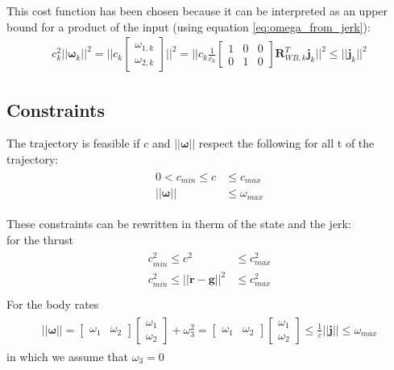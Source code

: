 This cost function has been chosen because it can be interpreted as an upper bound for a product of the input (using equation \ref{eq:omega_from_jerk}):
\begin{align}
c_k^2||\boldsymbol{\omega}_k||^2 = \Big|\Big| c_k
\begin{bmatrix}
\omega_{1,k} \\[2pt]
\omega_{2,k}
\end{bmatrix}\Big|\Big|^2 = \Big|\Big| c_k \frac{1}{c_k}
{\begin{bmatrix}
1 & 0 & 0  \\[2pt]
0 & 1 & 0
\end{bmatrix}}\boldsymbol{R}_{WB,k}^T \boldsymbol{j}_k\Big|\Big|^2 \leq ||\boldsymbol{j}_k||^2
\end{align}

\subsection{Constraints}
The trajectory is feasible if $c$ and $||\boldsymbol{\omega}||$ respect the following for all t of the trajectory:
\begin{align}
\begin{split}
0 < c_{min} \leq c &\leq c_{max}\\
||\boldsymbol{\omega}|| & \leq \omega_{max}
\end{split}
\end{align}

These constraints can be rewritten in therm of the state and the jerk:\\
for the thrust
\begin{align}
\begin{split}
 c_{min}^2 \leq c^2 &\leq c_{max}^2\\
 c_{min}^2 \leq ||\ddot{\boldsymbol{r}} - \boldsymbol{g}||^2 &\leq c_{max}^2\\
\end{split}
\label{eq:feasib_thrust}
\end{align}
For the body rates
\begin{align}
\begin{split}
||\boldsymbol{\omega}|| =
 {\begin{bmatrix}
\omega_1 & \omega_2
\end{bmatrix}}
 {\begin{bmatrix}
\omega_1 \\[10pt]
\omega_2
\end{bmatrix}} + \omega_3^2 = {\begin{bmatrix}
\omega_1 & \omega_2
\end{bmatrix}}
 {\begin{bmatrix}
\omega_1 \\[10pt]
\omega_2
\end{bmatrix}}  \leq \frac{1}{c}||\boldsymbol{j}||  \leq \omega_{max} 
\end{split}
\label{eq:feasib_bodyrates}
\end{align}
in which we assume that $\omega_3 = 0$

